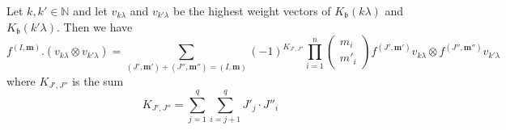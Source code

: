 \documentclass[10pt,a4paper]{amsart}
\newcommand{\N}{\mathbb{N}}
\begin{document}
\begin{lemma}\label{lemma-tensor-action-sign}
    Let $k,k'\in\N$ and let $v_{k\lambda}$ and $v_{k'\lambda}$ be the highest weight vectors of $K_{\mathfrak{b}}(k\lambda)$ and $K_{\mathfrak{b}}(k'\lambda)$.
    Then we have
    \begin{equation*}
        f^{(I,\mathbf{m})}.(v_{k\lambda}\otimes v_{k'\lambda})=\sum\limits_{(J',\mathbf{m}')+(J'',\mathbf{m}'')=(I,\mathbf{m})}(-1)^{K_{J',J''}}\prod\limits_{i=1}^{n}\begin{pmatrix}
            m_i\\
            m'_i
        \end{pmatrix}f^{(J',\mathbf{m}')}v_{k\lambda}\otimes f^{(J'',\mathbf{m}'')}v_{k'\lambda}
    \end{equation*}
    where $K_{J',J''}$ is the sum
    \begin{equation*}
        K_{J',J''}=\sum^q_{j=1}\sum^q_{i=j+1} J'_j\cdot J''_i
    \end{equation*}
\end{lemma}
\end{document}
